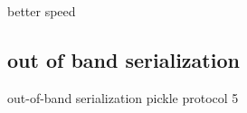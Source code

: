 \documentclass[13pt, usenames,dvipsnames]{beamer} %
\begin{document}
    \begin{frame}[t]{better speed}
    \end{frame}
\subsection{out of band serialization}
\begin{frame}[fragile]{out-of-band serialization}
    pickle protocol 5
\end{frame}



\begin{frame}[fragile]{}
    \begin{beamerboxesrounded}{}
        \inputminted[bgcolor=beige]{python}{scripts/test_script.py}
    \end{beamerboxesrounded}
\end{frame}
\end{document}
